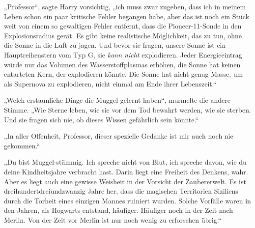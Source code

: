 „Professor“, sagte Harry vorsichtig, „ich muss zwar zugeben, dass ich in meinem Leben schon ein paar kritische Fehler begangen habe, aber das ist noch ein Stück weit von einem so gewaltigen Fehler entfernt, dass die Pioneer-11-Sonde in den Explosionsradius gerät. Es gibt keine realistische Möglichkeit, das zu tun, ohne die Sonne in die Luft zu jagen. Und bevor sie fragen, unsere Sonne ist ein Hauptreihenstern vom Typ G, sie \emph{kann nicht} explodieren. Jeder Energieeintrag würde nur das Volumen des Wasserstoffplasmas erhöhen, die Sonne hat keinen entarteten Kern, der explodieren könnte. Die Sonne hat nicht genug Masse, um als Supernova zu explodieren, nicht einmal am Ende ihrer Lebenszeit.“

„Welch erstaunliche Dinge die Muggel gelernt haben“, murmelte die andere Stimme.
„Wie Sterne leben, wie sie vor dem Tod bewahrt werden, wie sie sterben. Und sie fragen sich nie, ob dieses Wissen gefährlich sein könnte.“

„In aller Offenheit, Professor, dieser spezielle Gedanke ist mir auch noch nie gekommen.“

„Du bist Muggel-stämmig. Ich spreche nicht von Blut, ich spreche davon, wie du deine Kindheitsjahre verbracht hast. Darin liegt eine Freiheit des Denkens, wahr. Aber es liegt auch eine gewisse Weisheit in der Vorsicht der Zaubererwelt. Es ist dreihundertdreiundzwanzig Jahre her, dass die magischen Territorien Siziliens durch die Torheit eines einzigen Mannes ruiniert wurden. Solche Vorfälle waren in den Jahren, als Hogwarts entstand, häufiger. Häufiger noch in der Zeit nach Merlin. Von der Zeit vor Merlin ist nur noch wenig zu erforschen übrig.“

